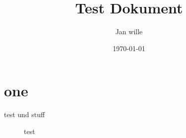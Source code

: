 \documentclass[ngerman,twoside]{HsH-report}
\title{Test Dokument}
\author{Jan wille}
\date{\today}
\begin{document}
\maketitle
\tableofcontents

\chapter{one}
    {\color{red}test} und stuff
    \begin{figure}

        \caption{test}
    \end{figure}

\listoffigures
\end{document}
